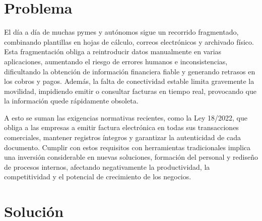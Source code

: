 
\section{Problema}

\begin{large}

El día a día de muchas pymes y autónomos sigue un recorrido fragmentado, combinando plantillas en hojas de cálculo, correos electrónicos y archivado físico. Esta fragmentación obliga a reintroducir datos manualmente en varias aplicaciones, aumentando el riesgo de errores humanos e inconsistencias, dificultando la obtención de información financiera fiable y generando retrasos en los cobros y pagos. Además, la falta de conectividad estable limita gravemente la movilidad, impidiendo emitir o consultar facturas en tiempo real, provocando que la información quede rápidamente obsoleta.

A esto se suman las exigencias normativas recientes, como la Ley 18/2022, que obliga a las empresas a emitir factura electrónica en todas sus transacciones comerciales, mantener registros íntegros y garantizar la autenticidad de cada documento. Cumplir con estos requisitos con herramientas tradicionales implica una inversión considerable en nuevas soluciones, formación del personal y rediseño de procesos internos, afectando negativamente la productividad, la competitividad y el potencial de crecimiento de los negocios.

\end{large}

\section{Solución}

